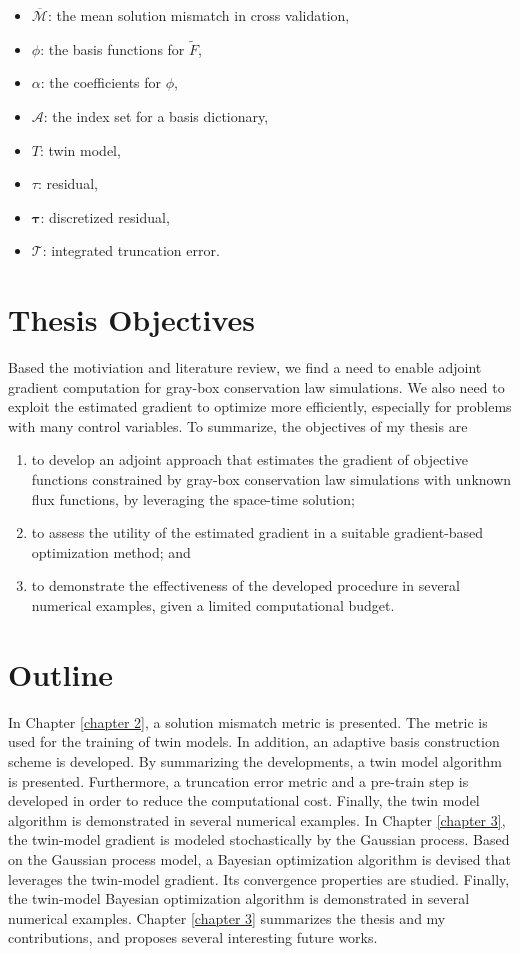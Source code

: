 \begin{itemize}
    \item $\overline{\mathcal{M}}$: the mean solution mismatch in cross validation,
    \item $\phi$: the basis functions for $\tilde{F}$,
    \item $\alpha$: the coefficients for $\phi$,
    \item $\mathcal{A}$: the index set for a basis dictionary,
    \item $T$: twin model,
    \item $\tau$: residual,
    \item $\boldsymbol{\tau}$: discretized residual,
    \item $\mathcal{T}$: integrated truncation error.
\end{itemize}



\section{Thesis Objectives}
Based the motiviation and literature review, we find a need to enable adjoint
gradient computation for gray-box conservation law simulations. We also need to 
exploit the estimated gradient to optimize more efficiently, 
especially for problems with many control variables. 
To summarize, the objectives of my thesis are
\begin{enumerate}
    \item to develop an adjoint approach that estimates the gradient of objective functions
          constrained by gray-box conservation law simulations with unknown flux functions,
          by leveraging the space-time solution;
    \item to assess the utility of the estimated gradient in a suitable 
          gradient-based optimization method; and
    \item to demonstrate the effectiveness of the developed procedure in several numerical examples,
          given a limited computational budget.
\end{enumerate}


\section{Outline}
In Chapter \ref{chapter 2}, a solution mismatch metric is presented. The metric
is used for the training of twin models.  In addition, an adaptive basis construction scheme 
is developed. By summarizing the developments, a twin model algorithm is presented. Furthermore,
a truncation error metric and a pre-train step is developed in order to reduce the computational cost.
Finally, the twin model algorithm is demonstrated in several numerical examples.
In Chapter \ref{chapter 3}, the twin-model gradient is modeled stochastically by the Gaussian process.
Based on the Gaussian process model, 
a Bayesian optimization algorithm is devised that leverages the twin-model gradient.
Its convergence properties are studied. Finally, the twin-model Bayesian optimization algorithm
is demonstrated in several numerical examples. Chapter \ref{chapter 3} summarizes the thesis and
my contributions, and proposes several interesting future works.

